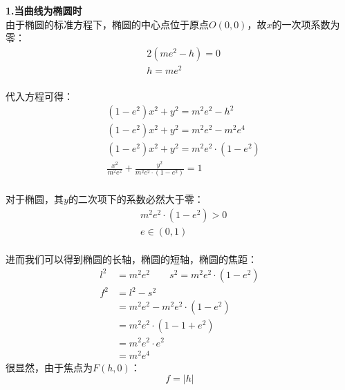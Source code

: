 \documentclass[UTF8]{ctexart}
\begin{document}
\newpage

    \textbf{1.当曲线为椭圆时}\\[3mm]
    \setcounter{equation}{0}
    由于椭圆的标准方程下，椭圆的中心点位于原点$O(0,0)$，故$x$的一次项系数为零：\vspace{5pt}
    \begin{align}
        &2\left(me^2-h\right)=0\\[3mm]
        &h=me^2
    \end{align}\\
    代入方程可得：
    \begin{align}
        &\left(1-e^2\right)x^2+y^2=m^2e^2-h^2\\[3mm]
        &\left(1-e^2\right)x^2+y^2=m^2e^2-m^2e^4\\[3mm]
        &\left(1-e^2\right)x^2+y^2=m^2e^2\cdot\left(1-e^2\right)\\[3mm]
        &\frac{x^2}{m^2e^2}+\frac{y^2}{m^2e^2\cdot\left(1-e^2\right)}=1
    \end{align}\\[1mm]
    对于椭圆，其$y$的二次项下的系数必然大于零：\vspace{5pt}
    \begin{align}
        &m^2e^2\cdot\left(1-e^2\right)>0\\[3mm]
        &e\in(0,1)
    \end{align}\\
    进而我们可以得到椭圆的长轴，椭圆的短轴，椭圆的焦距：\vspace{5pt}
    \begin{align}
        l^2&=m^2e^2\qquad s^2=m^2e^2\cdot\left(1-e^2\right)\\[4mm]
        f^2&=l^2-s^2\\[3mm]
        &=m^2e^2-m^2e^2\cdot\left(1-e^2\right)\\[3mm]
        &=m^2e^2\cdot\left(1-1+e^2\right)\\[3mm]
        &=m^2e^2\cdot e^2\\[3mm]
        &=m^2e^4
    \end{align}
    很显然，由于焦点为$F(h,0)$：
    \begin{equation}
        f=|h|
    \end{equation}

\newpage
\end{document}
